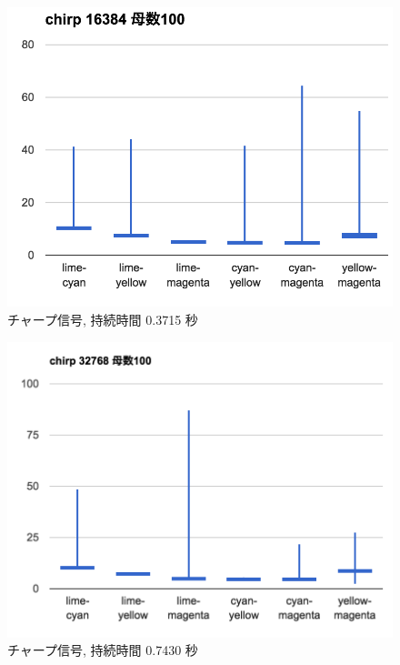 \begin{figure}[p]
  \centering
  \includegraphics[clip,width=1.05\hsize]{img/c16384.png}
  \caption{チャープ信号, 持続時間 0.3715 秒}\label{fig:c16384}
\end{figure}

\begin{figure}[p]
  \centering
  \includegraphics[clip,width=1.05\hsize]{img/c32768.png}
  \caption{チャープ信号, 持続時間 0.7430 秒}\label{fig:c32768}
\end{figure}

